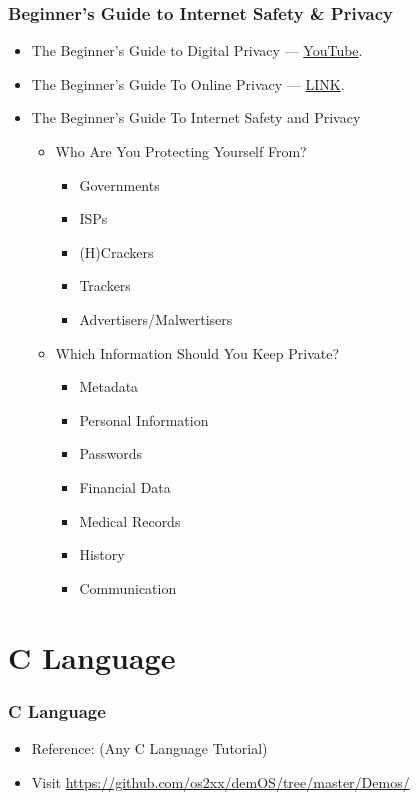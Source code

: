 \documentclass[aspectratio=169, xcolor=table, notheorems, hyperref={pdfpagelabels=false}]{beamer}
\begin{document}
\begin{frame}[fragile]
\frametitle{Beginner's Guide to Internet Safety \& Privacy}
\begin{itemize}
\item The Beginner’s Guide to Digital Privacy --- \href{https://www.youtube.com/watch?v=u8_9AQYLSbo}{YouTube}.
\item The Beginner’s Guide To Online Privacy  --- \href{https://www.freecodecamp.org/news/the-beginners-guide-to-online-privacy-7149b33c4a3e/}{LINK}.
\item The Beginner’s Guide To Internet Safety and Privacy
\begin{itemize}
\item Who Are You Protecting Yourself From?
\begin{itemize}
\item Governments
\item ISPs
\item (H)Crackers
\item Trackers
\item Advertisers/Malwertisers
\end{itemize}
\item Which Information Should You Keep Private?
\begin{itemize}
\item Metadata
\item Personal Information
\item Passwords
\item Financial Data
\item Medical Records
\item History
\item Communication
\end{itemize}
\end{itemize}
\end{itemize}
\end{frame}

\section{C Language}
\begin{frame}
\frametitle{C Language}
\begin{itemize}
\item Reference: (Any C Language Tutorial)
\item Visit
\url{https://github.com/os2xx/demOS/tree/master/Demos/}
\end{itemize}
\end{frame}
\end{document}
